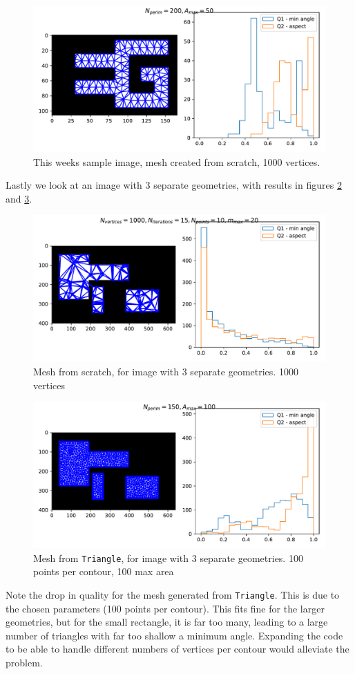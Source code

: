 \documentclass[sigconf]{acmart}
\begin{document}
\begin{figure}
	\includegraphics[width=\linewidth]{ex3.pdf}
	\caption{This weeks sample image, mesh created from scratch, 1000 vertices.}
	\label{fig:ex3}
\end{figure}
Lastly we look at an image with 3 separate geometries, with results in figures \ref{fig:ex7} and \ref{fig:ex6}.
\begin{figure}
	\includegraphics[width=\linewidth]{ex7.pdf}
	\caption{Mesh from scratch, for image with 3 separate geometries. 1000 vertices}
	\label{fig:ex7}
\end{figure}

\begin{figure}
	\includegraphics[width=\linewidth]{ex6.pdf}
	\caption{Mesh from \texttt{Triangle}, for image with 3 separate geometries. 100 points per contour, 100 max area}
	\label{fig:ex6}
\end{figure}
Note the drop in quality for the mesh generated from \texttt{Triangle}. This is due to the chosen parameters (100 points per contour). This fits fine for the larger geometries, but for the small rectangle, it is far too many, leading to a large number of triangles with far too shallow a minimum angle. Expanding the code to be able to handle different numbers of vertices per contour would alleviate the problem.
\end{document}

